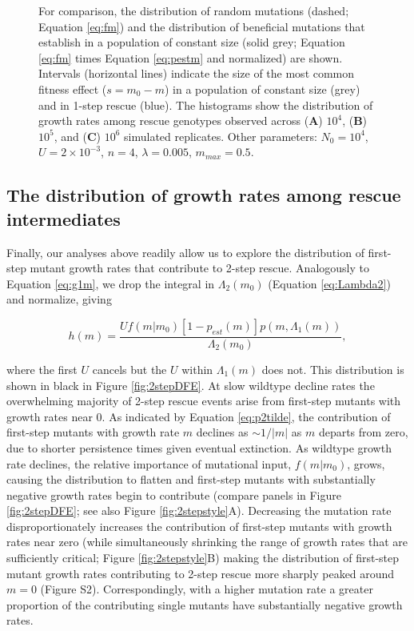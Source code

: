 \documentclass[9pt,twocolumn,twoside,lineno]{gsajnl}
\begin{document}
\begin{figure}[htbp]
{For comparison, the distribution of random mutations (dashed; Equation \ref{eq:fm}) and the distribution of beneficial mutations that establish in a population of constant size (solid grey; Equation \ref{eq:fm} times Equation \ref{eq:pestm} and normalized) are shown.
Intervals (horizontal lines) indicate the size of the most common fitness effect ($s=m_0-m$) in a population of constant size (grey) and in 1-step rescue (blue).
The histograms show the distribution of growth rates among rescue genotypes observed across (\textbf{A}) $10^4$, (\textbf{B}) $10^5$, and (\textbf{C}) $10^6$ simulated replicates.
Other parameters: $N_0=10^4$, $U=2\times 10^{-3}$, $n=4$, $\lambda=0.005$, $m_{max}=0.5$.
}%
\label{fig:1and2stepDFE}
\end{figure}

\subsection{The distribution of growth rates among rescue intermediates}
\label{sec:m1DFE}

Finally, our analyses above readily allow us to explore the distribution of first-step mutant growth rates that contribute to 2-step rescue.
Analogously to Equation \ref{eq:g1m}, we drop the integral in $\Lambda_2(m_0)$ (Equation \ref{eq:Lambda2}) and normalize, giving

\begin{equation}\label{eq:hm}
h(m) = \frac{U f(m|m_0) \left[ 1 - p_{est}(m) \right] p(m,\Lambda_{1}(m))}{\Lambda_2(m_0)},
\end{equation}

\noindent where the first $U$ cancels but the $U$ within $\Lambda_{1}(m)$ does not.
This distribution is shown in black in Figure \ref{fig:2stepDFE}.
At slow wildtype decline rates the overwhelming majority of 2-step rescue events arise from first-step mutants with growth rates near 0.
As indicated by Equation \ref{eq:p2tilde}, the contribution of first-step mutants with growth rate $m$ declines as $\sim1/|m|$ as $m$ departs from zero, due to shorter persistence times given eventual extinction.
As wildtype growth rate declines, the relative importance of mutational input, $f(m|m_0)$, grows, causing the distribution to flatten and first-step mutants with substantially negative growth rates begin to contribute (compare panels in Figure \ref{fig:2stepDFE}; see also Figure \ref{fig:2stepstyle}A).
Decreasing the mutation rate disproportionately increases the contribution of first-step mutants with growth rates near zero (while simultaneously shrinking the range of growth rates that are sufficiently critical; Figure \ref{fig:2stepstyle}B) making the distribution of first-step mutant growth rates contributing to 2-step rescue more sharply peaked around $m=0$ (Figure S2).
Correspondingly, with a higher mutation rate a greater proportion of the contributing single mutants have substantially negative growth rates.
\end{document}
